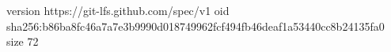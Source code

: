 version https://git-lfs.github.com/spec/v1
oid sha256:b86ba8fc46a7a7e3b9990d018749962fcf494fb46deaf1a53440cc8b24135fa0
size 72
